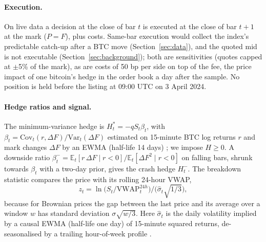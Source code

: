 \documentclass[10pt,a4paper]{article}
\newcommand{\E}{\mathbb{E}}
\begin{document}
\paragraph{Execution.} On live data a decision at the close of bar $t$ is executed at the close of bar $t{+}1$ at the mark ($P=F$), plus costs. Same-bar execution would collect the index's predictable catch-up after a BTC move (Section~\ref{sec:data}), and the quoted mid is not executable (Section~\ref{sec:background}); both are sensitivities (quotes capped at $\pm$5\% of the mark), as are costs of 50 bp per side on top of the fee, the price impact of one bitcoin's hedge in the order book a day after the sample. No position is held before the listing at 09:00 UTC on 3 April 2024.

\paragraph{Hedge ratios and signal.} The minimum-variance hedge is $H_t^\ast=-qS_t\beta_t$, with $\beta_t=\mathrm{Cov}_t(r,\Delta F)/\mathrm{Var}_t(\Delta F)$ estimated on 15-minute BTC log returns $r$ and mark changes $\Delta F$ by an EWMA (half-life 14 days) \citep{johnson1960theory,ederington1979hedging}; we impose $H\ge0$. A downside ratio $\beta^-_t=\E_t[r\,\Delta F\mid r<0]/\E_t[\Delta F^2\mid r<0]$ on falling bars, shrunk towards $\beta_t$ with a two-day prior, gives the crash hedge $H^-_t$. The breakdown statistic compares the price with its rolling 24-hour VWAP,
\begin{equation}\label{eq:z}
z_t=\ln\!\big(S_t/\mathrm{VWAP}^{24h}_t\big)\big/\big(\hat\sigma_t\sqrt{1/3}\big),
\end{equation}
because for Brownian prices the gap between the last price and its average over a window $w$ has standard deviation $\sigma\sqrt{w/3}$. Here $\hat\sigma_t$ is the daily volatility implied by a causal EWMA (half-life one day) of 15-minute squared returns, de-seasonalised by a trailing hour-of-week profile \citep{andersen1997intraday,hansen2024periodicity}.
\end{document}
